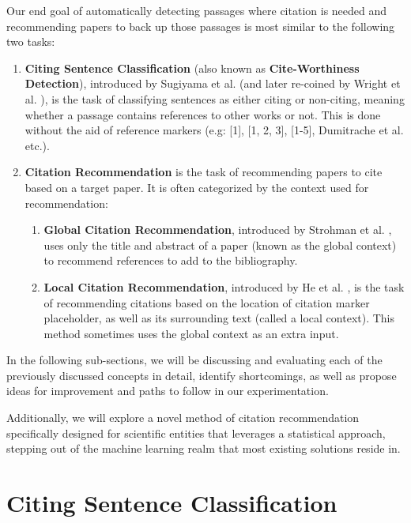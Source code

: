 \documentclass[12pt,a4paper]{report}
\begin{document}
Our end goal of automatically detecting passages where citation is needed and recommending papers to back up those passages is most similar to the following two tasks:
\begin{enumerate}
    \item \textbf{Citing Sentence Classification} (also known as \textbf{Cite-Worthiness Detection}), introduced by Sugiyama et al. \cite{Sugiyama2010IdentifyingCS} (and later re-coined by Wright et al. \cite{Wright2021CiteWorthCD}), is the task of classifying sentences as either citing or non-citing, meaning whether a passage contains references to other works or not. This is done without the aid of reference markers (e.g: [1], [1, 2, 3], [1-5], Dumitrache et al. etc.).
    \item \textbf{Citation Recommendation} is the task of recommending papers to cite based on a target paper. It is often categorized by the context used for recommendation:
    \begin{enumerate}
        \item \textbf{Global Citation Recommendation}, introduced by Strohman et al. \cite{Strohman2007RecommendingCF}, uses only the title and abstract of a paper (known as the global context) to recommend references to add to the bibliography.
        \item \textbf{Local Citation Recommendation}, introduced by He et al. \cite{He2010ContextawareCR}, is the task of recommending citations based on the location of citation marker placeholder, as well as its surrounding text (called a local context). This method sometimes uses the global context as an extra input.
    \end{enumerate}
\end{enumerate}

In the following sub-sections, we will be discussing and evaluating each of the previously discussed concepts in detail, identify shortcomings, as well as propose ideas for improvement and paths to follow in our experimentation.

Additionally, we will explore a novel method of citation recommendation specifically designed for scientific entities that leverages a statistical approach, stepping out of the machine learning realm that most existing solutions reside in.

\newpage

\section{Citing Sentence Classification}
\end{document}
